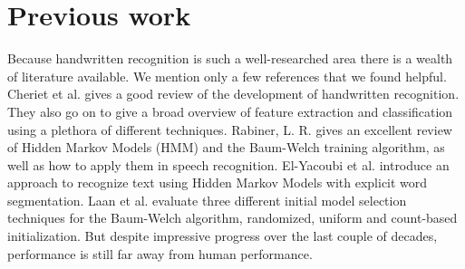 \section{Previous work}
Because handwritten recognition is such a well-researched area there is a wealth of literature available.
We mention only a few references that we found helpful.
Cheriet et al. \cite{Cheriet} gives a good review of the development of handwritten recognition.
They also go on to give a broad overview of feature extraction and classification using a plethora of different techniques.
Rabiner, L. R. \cite{Rabiner1989} gives an excellent review of Hidden Markov Models (HMM) and the Baum-Welch training algorithm, as well as how to apply them in speech recognition.
El-Yacoubi et al. \cite{intro-Yacoubi} introduce an approach to recognize text using Hidden Markov Models with explicit word segmentation.
Laan et al. \cite{initialmodel} evaluate three different initial model selection techniques for the Baum-Welch algorithm, randomized, uniform and count-based initialization.
But despite impressive progress over the last couple of decades, performance is still far away from human performance.


